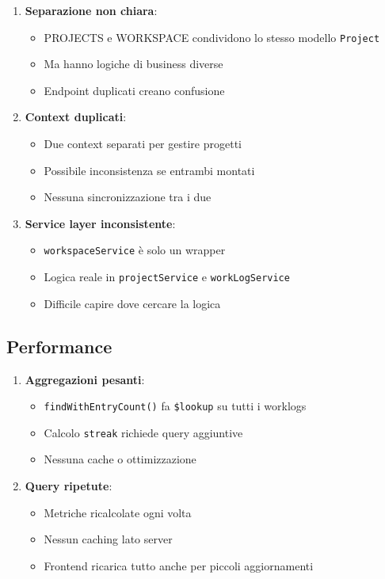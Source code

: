 \documentclass[11pt,a4paper]{article}
\begin{document}
\begin{enumerate}
    \item \textbf{Separazione non chiara}:
    \begin{itemize}
        \item PROJECTS e WORKSPACE condividono lo stesso modello \texttt{Project}
        \item Ma hanno logiche di business diverse
        \item Endpoint duplicati creano confusione
    \end{itemize}
    
    \item \textbf{Context duplicati}:
    \begin{itemize}
        \item Due context separati per gestire progetti
        \item Possibile inconsistenza se entrambi montati
        \item Nessuna sincronizzazione tra i due
    \end{itemize}
    
    \item \textbf{Service layer inconsistente}:
    \begin{itemize}
        \item \texttt{workspaceService} è solo un wrapper
        \item Logica reale in \texttt{projectService} e \texttt{workLogService}
        \item Difficile capire dove cercare la logica
    \end{itemize}
\end{enumerate}

\subsection{Performance}

\begin{enumerate}
    \item \textbf{Aggregazioni pesanti}:
    \begin{itemize}
        \item \texttt{findWithEntryCount()} fa \texttt{\$lookup} su tutti i worklogs
        \item Calcolo \texttt{streak} richiede query aggiuntive
        \item Nessuna cache o ottimizzazione
    \end{itemize}
    
    \item \textbf{Query ripetute}:
    \begin{itemize}
        \item Metriche ricalcolate ogni volta
        \item Nessun caching lato server
        \item Frontend ricarica tutto anche per piccoli aggiornamenti
    \end{itemize}
\end{enumerate}
\end{document}
